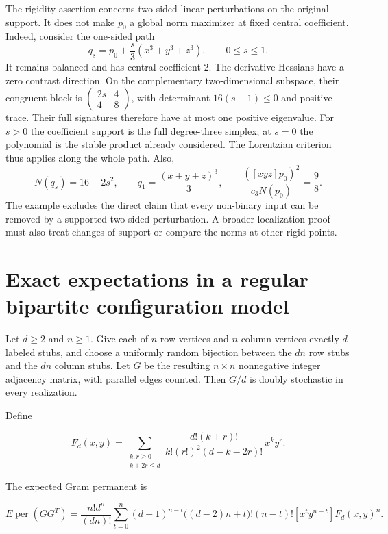 \documentclass[11pt,a4paper]{article}
\theoremstyle{definition}
\theoremstyle{remark}
\begin{document}
The rigidity assertion concerns two-sided linear perturbations on the original support.
It does not make $p_0$ a global norm maximizer at fixed central coefficient.
Indeed, consider the one-sided path
\[
 q_s=p_0+\frac{s}{3}(x^3+y^3+z^3),\qquad 0\le s\le1.
\]
It remains balanced and has central coefficient $2$.
The derivative Hessians have a zero contrast direction.
On the complementary two-dimensional subspace, their congruent block is
$\left(\begin{smallmatrix}2s&4\\4&8\end{smallmatrix}\right)$, with determinant $16(s-1)\le0$ and positive trace.
Their full signatures therefore have at most one positive eigenvalue.
For $s>0$ the coefficient support is the full degree-three simplex; at $s=0$ the polynomial is the stable product already considered.
The Lorentzian criterion thus applies along the whole path.
Also,
\[
 N(q_s)=16+2s^2,\qquad
 q_1=\frac{(x+y+z)^3}{3},\qquad
 \frac{([xyz]p_0)^2}{c_3N(p_0)}=\frac98.
\]
The example excludes the direct claim that every non-binary input can be removed by a supported two-sided perturbation.
A broader localization proof must also treat changes of support or compare the norms at other rigid points.


\section{Exact expectations in a regular bipartite configuration
model}\label{sec:configuration}

Let \(d\ge2\) and \(n\ge1\). Give each of \(n\) row vertices and \(n\)
column vertices exactly \(d\) labeled stubs, and choose a uniformly
random bijection between the \(dn\) row stubs and the \(dn\) column
stubs. Let \(G\) be the resulting \(n\times n\) nonnegative integer
adjacency matrix, with parallel edges counted. Then \(G/d\) is doubly
stochastic in every realization.

Define

\[
F_d(x,y)=
\sum_{\substack{k,r\ge0\\k+2r\le d}}
\frac{d!(k+r)!}{k!(r!)^2(d-k-2r)!}\,x^ky^r.
\]

The expected Gram permanent is

\begin{equation}\label{eq:rg-2}
\boxed{
E\operatorname{per}(GG^T)
=\frac{n!d^n}{(dn)!}
\sum_{t=0}^{n}
(d-1)^{n-t}\bigl((d-2)n+t\bigr)!(n-t)!
[x^ty^{n-t}]F_d(x,y)^n.
}
\end{equation}
\end{document}
